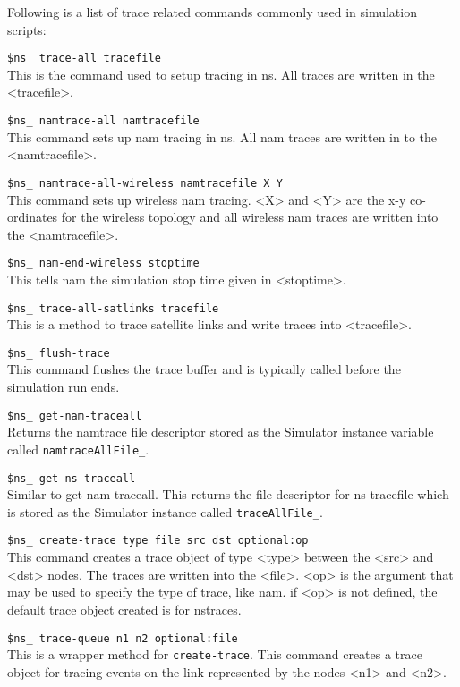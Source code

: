 Following is a list of trace related commands commonly used in
simulation scripts:
\begin{flushleft}
{\tt \$ns\_ trace-all \<tracefile\>}\\
This is the command used to setup tracing in ns. All traces are written in
the <tracefile>.


{\tt \$ns\_ namtrace-all \<namtracefile\>}\\
This command sets up nam tracing in ns. All nam traces are written in to
the <namtracefile>.


{\tt \$ns\_ namtrace-all-wireless \<namtracefile\> \<X\> \<Y\>}\\
This command sets up wireless nam tracing. <X> and <Y> are the x-y co-ordinates
for the wireless topology and all wireless nam traces are written  into
the <namtracefile>.


{\tt \$ns\_ nam-end-wireless \<stoptime\>}\\
This tells nam the simulation stop time  given in <stoptime>.


{\tt \$ns\_ trace-all-satlinks \<tracefile\>}\\
This is a method to trace satellite links and write traces into <tracefile>.


{\tt \$ns\_ flush-trace}\\
This command flushes the trace buffer and is typically called before the
simulation run ends.


{\tt \$ns\_ get-nam-traceall}\\
Returns the namtrace file descriptor stored as the Simulator instance
variable called {\tt namtraceAllFile\_}.


{\tt \$ns\_ get-ns-traceall}\\
Similar to get-nam-traceall. This returns the file descriptor for ns tracefile
which is stored as the Simulator instance called {\tt traceAllFile\_}.


{\tt \$ns\_ create-trace \<type\> \<file\> \<src\> \<dst\> \<optional:op\>}\\
This command creates a trace object of type <type> between the <src> and
<dst> nodes. The traces are written into the <file>. <op> is the argument
that may be used to specify the type of trace, like nam. if <op> is not
defined, the default trace object created is for nstraces.


{\tt \$ns\_ trace-queue \<n1\> \<n2\> \<optional:file\>}\\
This is a wrapper method for {\tt create-trace}. This command creates a
trace object for tracing events on the link represented by the nodes <n1>
and <n2>.



\end{flushleft}

